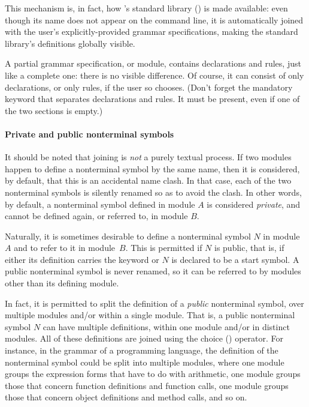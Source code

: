 \documentclass[onecolumn,11pt,nocopyrightspace,preprint]{sigplanconf}
\begin{document}
This mechanism is, in fact, how \menhir's standard library ()
is made available: even though its name does not appear on the command line,
it is automatically joined with the user's explicitly-provided grammar
specifications, making the standard library's definitions globally visible.

A partial grammar specification, or module, contains declarations and rules,
just like a complete one: there is no visible difference. Of course, it can
consist of only declarations, or only rules, if the user so chooses. (Don't
forget the mandatory \percentpercent keyword that separates declarations and
rules. It must be present, even if one of the two sections is empty.)

\paragraph{Private and public nonterminal symbols}

It should be noted that joining is \emph{not} a purely textual process. If two
modules happen to define a nonterminal symbol by the same name, then it is
considered, by default, that this is an accidental name clash. In that case,
each of the two nonterminal symbols is silently renamed so as to avoid the
clash. In other words, by default, a nonterminal symbol defined in module $A$
is considered \emph{private}, and cannot be defined again, or referred to, in
module $B$.

Naturally, it is sometimes desirable to define a nonterminal symbol $N$ in
module $A$ and to refer to it in module~$B$. This is permitted if $N$ is
public, that is, if either its definition carries the keyword \dpublic or
$N$ is declared to be a start symbol. A public nonterminal symbol is never
renamed, so it can be referred to by modules other than its defining module.

In fact, it is permitted to split the definition of a \emph{public} nonterminal
symbol, over multiple modules and/or within a single module.
That is, a public nonterminal symbol $N$ can
have multiple definitions, within one module and/or in distinct modules.
All of these definitions are joined using the choice (\barre) operator.
For instance, in the grammar of a
programming language, the definition of the nonterminal symbol 
could be split into multiple modules, where one module groups the expression
forms that have to do with arithmetic, one module groups those that concern
function definitions and function calls, one module groups those that concern
object definitions and method calls, and so on.
\end{document}
